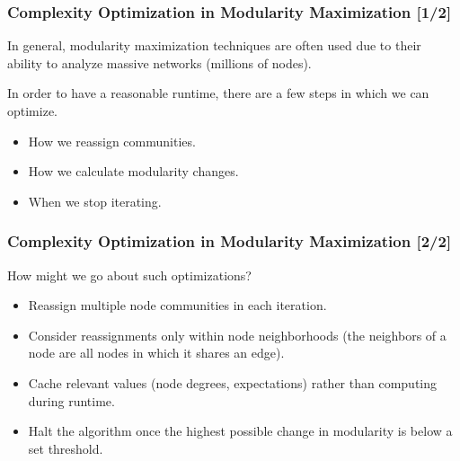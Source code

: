 \documentclass{beamer}
\begin{document}
\begin{frame}

    \frametitle{Complexity Optimization in Modularity Maximization [1/2]}

    In general, modularity maximization techniques are often used due to their ability to analyze massive networks (millions of nodes).\pause

    \vspace{2.5mm}
    In order to have a reasonable runtime, there are a few steps in which we can optimize.\pause

    \vspace{2.5mm}
    \begin{itemize}
        \item How we reassign communities.\pause
        \item How we calculate modularity changes.\pause
        \item When we stop iterating. 
    \end{itemize}

\end{frame}

\begin{frame}

    \frametitle{Complexity Optimization in Modularity Maximization [2/2]}

    How might we go about such optimizations?

    \vspace{2.5mm}
    \begin{itemize}
        \item Reassign multiple node communities in each iteration.\pause
        \item Consider reassignments only within node neighborhoods (the neighbors of a node are all nodes in which it shares an edge).\pause
        \item Cache relevant values (node degrees, expectations) rather than computing during runtime.\pause
        \item Halt the algorithm once the highest possible change in modularity is below a set threshold. 
    \end{itemize}

\end{frame}

\end{document}
